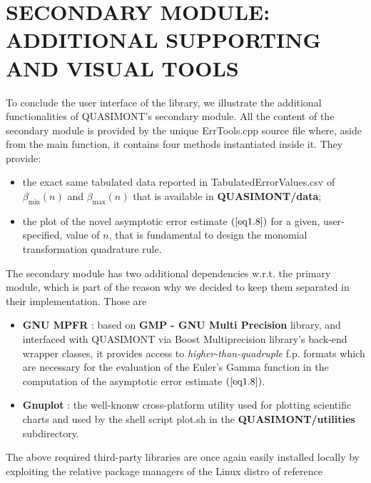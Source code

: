 \documentclass[a4paper, twosided]{book}
\begin{document}
\newpage
\section[Additional supporting and visual tools]{\changefont SECONDARY MODULE:  ADDITIONAL SUPPORTING AND VISUAL TOOLS}\label{Sec3.5}

\noindent
To conclude the user interface of the library, we illustrate the additional functionalities of QUASIMONT's secondary module. All the content of the secondary module is provided by the unique \colorbox{poliGrayBlue}{ErrTools.cpp} source file where, aside from the \colorbox{poliGrayBlue}{main} function, it contains four methods instantiated inside it. They provide:
\begin{itemize}
    \item the exact same tabulated data reported in \colorbox{poliGrayBlue}{TabulatedErrorValues.csv} of $\beta_{\text{min}}(n)$ and $\beta_{\text{max}}(n)$ that is available in \colorbox{poliGrayBlue}{\textbf{QUASIMONT/data}};
    \item the plot of the novel asymptotic error estimate $(\ref{eq1.8})$ for a given, user-specified, value of $n$, that is fundamental to design the monomial transformation quadrature rule. \color{black} 
\end{itemize}

\noindent
The secondary module has two additional dependencies w.r.t. the primary module, which is part of the reason why we decided to keep them separated in their implementation. Those are
\begin{itemize}
    \item \color{poliDarkBlue} \textbf{GNU MPFR} \color{black}\cite{mpfr}: based on \color{poliDarkBlue} \textbf{GMP - GNU Multi Precision} \color{black} library, and interfaced with QUASIMONT via Boost Multiprecision library's back-end wrapper classes, it provides access to {\itshape higher-than-quadruple} f.p. formats which are necessary for the evaluation of the Euler's Gamma function in the computation of the asymptotic error estimate $(\ref{eq1.8})$.
    \item \color{poliDarkBlue} \textbf{Gnuplot} \color{black}: the well-knonw cross-platform utility used for plotting scientific charts and used by the shell script \colorbox{poliGrayBlue}{plot.sh} in the \colorbox{poliGrayBlue}{\textbf{QUASIMONT/utilities}} subdirectory.
\end{itemize}

\noindent
The above required third-party libraries are once again easily installed locally by exploiting the relative package managers of the Linux distro of reference
\end{document}
